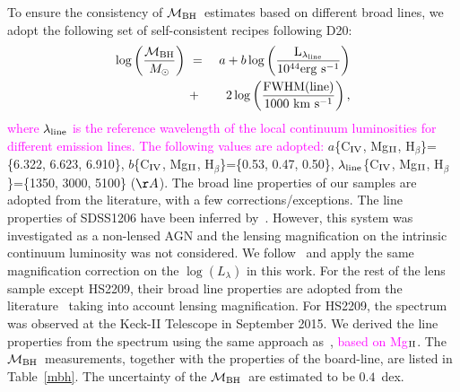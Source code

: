\documentclass[fleqn,usenatbib]{mnras}
\newcommand{\mbh}{$\mathcal M_{\rm BH}$}
\newcommand{\Hb}{H$_{\beta}$}
\newcommand{\Mgii}{Mg$_{\rm II}$}
\newcommand{\Civ}{C$_{\rm IV}$}
\newcommand{\pink}[1]{{\textcolor{magenta}{#1}}}
\begin{document}
To ensure the consistency of \mbh\ estimates based on different broad lines, we adopt the following set of self-consistent recipes following D20:
\begin{eqnarray}
\label{recipe}
\log \left(\frac{\mathcal M_{\rm BH}}{M_{\odot}}\right)&~=~& a+b \log \left(\frac{ \rm L _{\lambda_{line}}}{10^{44}{\rm erg~s^{-1}}}\right) \nonumber\\
&~+~& 2 \log \left(\frac{\rm FWHM(line)}{1000 ~{\rm km~s^{-1}}}\right) , 
\end {eqnarray}
\pink{where $\lambda_{\rm line}$ is the reference wavelength of the local continuum luminosities for different emission lines. The following values are adopted:}
%
$a$\{\Civ, \Mgii, \Hb\}=\{6.322, 6.623, 6.910\},
$b$\{\Civ, \Mgii, \Hb\}=\{0.53, 0.47, 0.50\},
$\lambda_{\rm line}$\{\Civ, \Mgii, \Hb\}=\{1350, 3000, 5100\} ($\AA$).
%
The broad line properties of our samples are adopted from the literature, with a few corrections/exceptions. %
The line properties of SDSS1206 have been inferred by~\citet{Shen2011}. However, this system was investigated as a non-lensed AGN and the lensing magnification on the intrinsic continuum luminosity was not considered. We follow~\citet{Birrer2019} and apply the same magnification correction on the $\log(L_\lambda)$ in this work. For the rest of the lens sample except HS2209, their broad line properties are adopted from the literature~\citep{Sluse2012, Peng2006} taking into account lensing magnification. For HS2209, the spectrum was observed at the Keck-II Telescope in September 2015. We derived the line properties from the spectrum using the same approach as~\citet{Sluse2012}, \pink{based on \Mgii}. The \mbh\ measurements, together with the properties of the board-line, are listed in Table~\ref{mbh}. 
The uncertainty of the \mbh\ are estimated to be $0.4$~dex.
\end{document}
